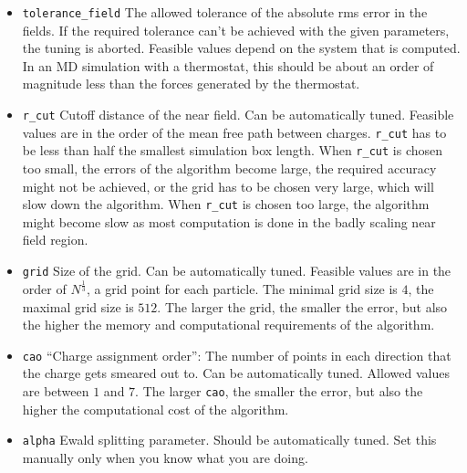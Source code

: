 \begin{itemize}
\item \verb!tolerance_field! The allowed tolerance of the absolute rms
  error in the fields. If the required tolerance can't be achieved
  with the given parameters, the tuning is aborted. Feasible values
  depend on the system that is computed. In an MD simulation with a
  thermostat, this should be about an order of magnitude less than the
  forces generated by the thermostat.
\item \verb!r_cut! Cutoff distance of the near field.  Can be
  automatically tuned.  Feasible values are in the order of the mean
  free path between charges. \verb!r_cut! has to be less than half the
  smallest simulation box length.  When \verb!r_cut! is chosen too
  small, the errors of the algorithm become large, the required
  accuracy might not be achieved, or the grid has to be chosen very
  large, which will slow down the algorithm.  When \verb!r_cut! is
  chosen too large, the algorithm might become slow as most
  computation is done in the badly scaling near field region.
\item \verb!grid! Size of the grid. Can be automatically
  tuned. Feasible values are in the order of $N^{\frac{1}{3}}$, \ie a
  grid point for each particle. The minimal grid size is $4$, the
  maximal grid size is $512$. The larger the grid, the smaller the
  error, but also the higher the memory and computational requirements
  of the algorithm.
\item \verb!cao! ``Charge assignment order'': The number of points in
  each direction that the charge gets smeared out to. Can be
  automatically tuned.  Allowed values are between $1$ and $7$.  The
  larger \verb!cao!, the smaller the error, but also the higher the
  computational cost of the algorithm.
\item \verb!alpha! Ewald splitting parameter. Should be automatically
  tuned. Set this manually only when you know what you are doing.
\end{itemize}


